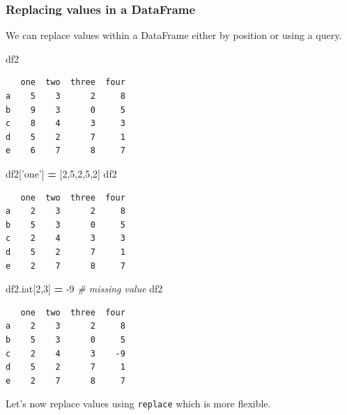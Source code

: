 \documentclass[
  letterpaper,
]{scrbook}
\newenvironment{Shaded}{\begin{snugshade}}{\end{snugshade}}
\newcommand{\CommentTok}[1]{\textcolor[rgb]{0.56,0.35,0.01}{\textit{#1}}}
\newcommand{\DecValTok}[1]{\textcolor[rgb]{0.00,0.00,0.81}{#1}}
\newcommand{\NormalTok}[1]{#1}
\newcommand{\OperatorTok}[1]{\textcolor[rgb]{0.81,0.36,0.00}{\textbf{#1}}}
\newcommand{\StringTok}[1]{\textcolor[rgb]{0.31,0.60,0.02}{#1}}
\begin{document}
\hypertarget{replacing-values-in-a-dataframe}{%
\subsubsection{Replacing values in a DataFrame}\label{replacing-values-in-a-dataframe}}

We can replace values within a DataFrame either by position or using a query.

\begin{Shaded}
\begin{Highlighting}[]
\NormalTok{df2}
\end{Highlighting}
\end{Shaded}

\begin{verbatim}
   one  two  three  four
a    5    3      2     8
b    9    3      0     5
c    8    4      3     3
d    5    2      7     1
e    6    7      8     7
\end{verbatim}

\begin{Shaded}
\begin{Highlighting}[]
\NormalTok{df2[}\StringTok{'one'}\NormalTok{] }\OperatorTok{=}\NormalTok{ [}\DecValTok{2}\NormalTok{,}\DecValTok{5}\NormalTok{,}\DecValTok{2}\NormalTok{,}\DecValTok{5}\NormalTok{,}\DecValTok{2}\NormalTok{]}
\NormalTok{df2}
\end{Highlighting}
\end{Shaded}

\begin{verbatim}
   one  two  three  four
a    2    3      2     8
b    5    3      0     5
c    2    4      3     3
d    5    2      7     1
e    2    7      8     7
\end{verbatim}

\begin{Shaded}
\begin{Highlighting}[]
\NormalTok{df2.iat[}\DecValTok{2}\NormalTok{,}\DecValTok{3}\NormalTok{] }\OperatorTok{=} \DecValTok{-9} \CommentTok{# missing value}
\NormalTok{df2}
\end{Highlighting}
\end{Shaded}

\begin{verbatim}
   one  two  three  four
a    2    3      2     8
b    5    3      0     5
c    2    4      3    -9
d    5    2      7     1
e    2    7      8     7
\end{verbatim}

Let's now replace values using \texttt{replace} which is more flexible.
\end{document}
